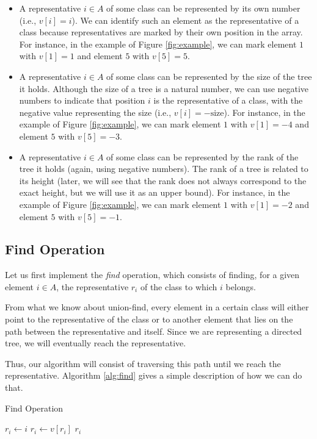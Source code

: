 \begin{itemize}
    \item A representative $i \in A$ of some class can be represented by its own number (i.e., $v[i] = i$). We can identify such an element as the representative of a class because representatives are marked by their own position in the array. For instance, in the example of Figure \ref{fig:example}, we can mark element $1$ with $v[1] = 1$ and element $5$ with $v[5] = 5$.
    
    \item A representative $i \in A$ of some class can be represented by the size of the tree it holds. Although the size of a tree is a natural number, we can use negative numbers to indicate that position $i$ is the representative of a class, with the negative value representing the size (i.e., $v[i] = -\text{size}$). For instance, in the example of Figure \ref{fig:example}, we can mark element $1$ with $v[1] = -4$ and element $5$ with $v[5] = -3$.
    
    \item A representative $i \in A$ of some class can be represented by the rank of the tree it holds (again, using negative numbers). The rank of a tree is related to its height (later, we will see that the rank does not always correspond to the exact height, but we will use it as an upper bound). For instance, in the example of Figure \ref{fig:example}, we can mark element $1$ with $v[1] = -2$ and element $5$ with $v[5] = -1$.
\end{itemize}

\subsection{Find Operation}
Let us first implement the \textit{find} operation, which consists of finding, for a given element \( i \in A \), the representative \( r_i \) of the class to which \( i \) belongs.

From what we know about union-find, every element in a certain class will either point to the representative of the class or to another element that lies on the path between the representative and itself. Since we are representing a directed tree, we will eventually reach the representative.

Thus, our algorithm will consist of traversing this path until we reach the representative. Algorithm \ref{alg:find} gives a simple description of how we can do that.

\begin{algorithm}
    \caption{Find Operation}\label{alg:find}
    \begin{algorithmic}
        \State $r_i \gets i$
        \State $r_i \gets v[r_i]$
        \EndWhile
        \State \Return $r_i$
        \EndFunction
    \end{algorithmic}
\end{algorithm}

